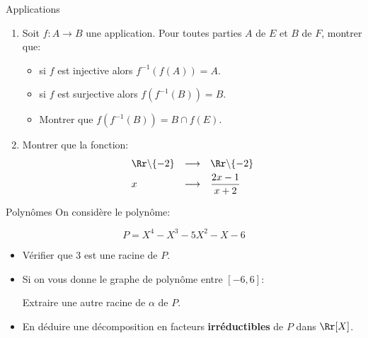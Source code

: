 \documentclass[exam]{cs188}
\begin{document}
\begin{problem}[7]{Applications }
    \begin{enumerate}
        \item Soit $f:A\longrightarrow B$ une application. Pour toutes parties $A$ de
   $E$ et $B$ de $F$, montrer que:

   \begin{itemize}
       \item si $f$ est injective alors $f^{-1}(f(A)) = A$.
       \item si $f$ est surjective alors $f\left(f^{-1}(B)\right)= B$.
       \item Montrer que $f\left(f^{-1}(B)\right) = B \cap f(E)$.
   \end{itemize}
   \item Montrer que la fonction:
       \begin{equation*}
           \begin{array}{lll}
               \Rr\backslash\{-2\} & \longrightarrow &
               \Rr\backslash\{-2\}\\[4pt]
               x           &\longrightarrow & \dfrac{2x-1}{x+2}
          \end{array} 
       \end{equation*}
       \end{enumerate}

\end{problem}
\begin{problem}[4]{Polynômes}
    On considère le polynôme:

    \begin{equation}
        P = X^4 -X^3 -5X^2 - X - 6
    \end{equation}
    
\begin{itemize}
    \item Vérifier que $3$ est une racine de $P$. 
    \item Si on vous donne le graphe de polynôme entre $[-6,6]$:

    \begin{figure}[htpb]
    \begin{center}
    \end{center}
    \end{figure}
   Extraire une autre racine de  $\alpha$ de $P$. 

   \item En déduire une décomposition en facteurs \textbf{irréductibles}  de $P$
       dans $\Rr[X]$.
\end{itemize}
\end{problem}
\end{document}
